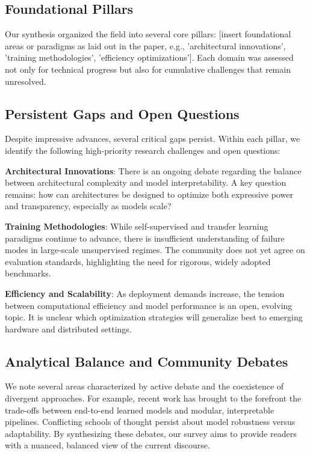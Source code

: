 \documentclass[sigconf]{acmart}
\begin{document}
\subsection{Foundational Pillars}

Our synthesis organized the field into several core pillars: [insert foundational areas or paradigms as laid out in the paper, e.g., 'architectural innovations', 'training methodologies', 'efficiency optimizations']. Each domain was assessed not only for technical progress but also for cumulative challenges that remain unresolved.

\subsection{Persistent Gaps and Open Questions}

Despite impressive advances, several critical gaps persist. Within each pillar, we identify the following high-priority research challenges and open questions:

\textbf{Architectural Innovations}: There is an ongoing debate regarding the balance between architectural complexity and model interpretability. A key question remains: how can architectures be designed to optimize both expressive power and transparency, especially as models scale?

\textbf{Training Methodologies}: While self-supervised and transfer learning paradigms continue to advance, there is insufficient understanding of failure modes in large-scale unsupervised regimes. The community does not yet agree on evaluation standards, highlighting the need for rigorous, widely adopted benchmarks.

\textbf{Efficiency and Scalability}: As deployment demands increase, the tension between computational efficiency and model performance is an open, evolving topic. It is unclear which optimization strategies will generalize best to emerging hardware and distributed settings.

\subsection{Analytical Balance and Community Debates}

We note several areas characterized by active debate and the coexistence of divergent approaches. For example, recent work has brought to the forefront the trade-offs between end-to-end learned models and modular, interpretable pipelines. Conflicting schools of thought persist about model robustness versus adaptability. By synthesizing these debates, our survey aims to provide readers with a nuanced, balanced view of the current discourse.
\end{document}
